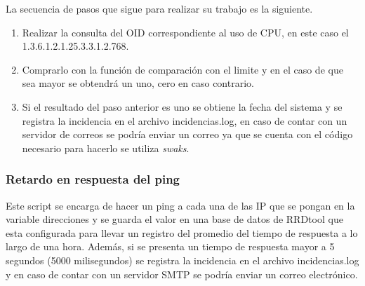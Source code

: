 \documentclass[12pt, titlepage]{article}
\begin{document}
La secuencia de pasos que sigue para realizar su trabajo es la siguiente.
\begin{enumerate}
 \item Realizar la consulta del OID correspondiente al uso de CPU, en este caso el 1.3.6.1.2.1.25.3.3.1.2.768.
 \item Comprarlo con la función de comparación con el limite y en el caso de que sea mayor se obtendrá un uno, cero en caso contrario.
 \item Si el resultado del paso anterior es uno se obtiene la fecha del sistema y se registra la incidencia en el archivo incidencias.log, en caso de contar con un servidor de correos se podría enviar un correo ya que se cuenta con el código necesario para hacerlo se utiliza \emph{swaks}.
\end{enumerate}

\subsubsection{Retardo en respuesta del ping}
Este script se encarga de hacer un ping a cada una de las IP que se pongan en la variable direcciones y se guarda el valor en una base de datos de RRDtool que esta configurada para llevar un registro del promedio del tiempo de respuesta a lo largo de una hora. Además, si se presenta un tiempo de respuesta mayor a 5 segundos (5000 milisegundos) se registra la incidencia en el archivo incidencias.log y en caso de contar con un servidor SMTP se podría enviar un correo electrónico.
\end{document}
